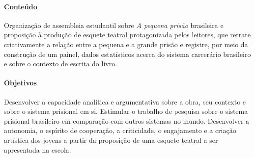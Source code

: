 \documentclass[11pt]{extarticle}
\begin{document}
\paragraph{Conteúdo} Organização de assembleia estudantil sobre \emph{A
pequena prisão} brasileira e proposição à produção de esquete teatral
protagonizada pelos leitores, que retrate criativamente a relação entre
a pequena e a grande prisão e registre, por meio da construção de um
painel, dados estatísticos acerca do sistema carcerário brasileiro e
sobre o contexto de escrita do livro.

\paragraph{Objetivos} Desenvolver a capacidade analítica e argumentativa
sobre a obra, seu contexto e sobre o sistema prisional em si. Estimular
o trabalho de pesquisa sobre o sistema prisional brasileiro em
comparação com outros sistemas no mundo. Desenvolver a autonomia, o
espírito de cooperação, a criticidade, o engajamento e a criação
artística dos jovens a partir da proposição de uma esquete teatral a ser
apresentada na escola.
\end{document}
